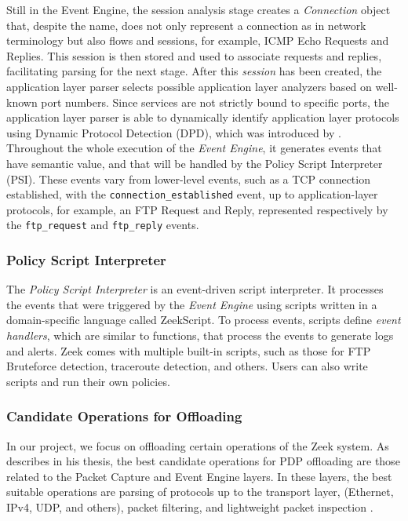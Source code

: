 Still in the Event Engine, the session analysis stage creates a \textit{Connection} object that, despite the name, does not only represent a connection as in network terminology but also flows and sessions, for example, ICMP Echo Requests and Replies. This session is then stored and used to associate requests and replies, facilitating parsing for the next stage. After this \textit{session} has been created, the application layer parser selects possible application layer analyzers based on well-known port numbers. Since services are not strictly bound to specific ports, the application layer parser is able to dynamically identify application layer protocols using Dynamic Protocol Detection (DPD), which was introduced by . Throughout the whole execution of the \textit{Event Engine}, it generates events that have semantic value, and that will be handled by the Policy Script Interpreter (PSI). These events vary from lower-level events, such as a TCP connection established, with the \texttt{connection\_established} event, up to application-layer protocols, for example, an FTP Request and Reply, represented respectively by the \texttt{ftp\_request} and  \texttt{ftp\_reply} events.


\subsubsection*{Policy Script Interpreter}
\label{sec:bg:zeek_psi}

The \textit{Policy Script Interpreter} is an event-driven script interpreter. It processes the events that were triggered by the \textit{Event Engine} using scripts written in a domain-specific language called ZeekScript. To process events, scripts define \textit{event handlers}, which are similar to functions, that process the events to generate logs and alerts. Zeek comes with multiple built-in scripts, such as those for FTP Bruteforce detection, traceroute detection, and others. Users can also write scripts and run their own policies.


\subsubsection*{Candidate Operations for Offloading}
\label{sec:bg:zeek_candidate_operations}

In our project, we focus on offloading certain operations of the Zeek system. As  describes in his thesis, the best candidate operations for PDP offloading are those related to the Packet Capture and Event Engine layers. In these layers, the best suitable operations are parsing of protocols up to the transport layer, (Ethernet, IPv4, UDP, and others), packet filtering, and lightweight packet inspection \cite{Ilha2022}.

